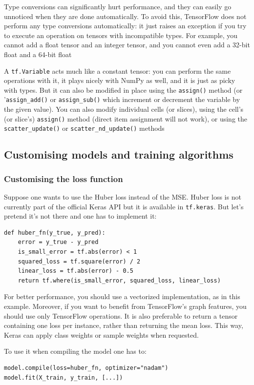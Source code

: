 \documentclass[12pt, letterpaper]{article}
\theoremstyle{definition}
\let\cd\lstinline
\begin{document}
Type conversions can significantly hurt performance, and they can easily go unnoticed when they are done automatically. To avoid this, TensorFlow does not perform any type conversions automatically: it just raises an exception if you try to execute an operation on tensors with incompatible types. For example, you cannot add a float tensor and an integer tensor, and you cannot even add a 32-bit float and a 64-bit float

A \cd+tf.Variable+ acts much like a constant tensor: you can perform the same operations with it, it plays nicely with NumPy as well, and it is just as picky with types. But it can also be modified in place using the \cd+assign()+ method (or '\cd+assign_add()+ or \cd+assign_sub()+ which increment or decrement the variable by the given value). You can also modify individual cells (or slices), using the cell's (or slice's) \cd+assign()+ method (direct item assignment will not work), or using the \cd+scatter_update()+ or \cd+scatter_nd_update()+ methods

\subsection{Customising  models and training algorithms}
\subsubsection{Customising the loss function}
Suppose one wants to use the Huber loss instead of the MSE. Huber loss is not currently part of the official Keras API but it is available in \cd+tf.keras+. But let's pretend it's not there and one has to implement it:
\begin{lstlisting}
def huber_fn(y_true, y_pred):
	error = y_true - y_pred
	is_small_error = tf.abs(error) < 1
	squared_loss = tf.square(error) / 2
	linear_loss = tf.abs(error) - 0.5
	return tf.where(is_small_error, squared_loss, linear_loss)
\end{lstlisting}
For better performance, you should use a vectorized implementation, as in this example. Moreover, if you want to benefit from TensorFlow's graph features, you should use only TensorFlow operations. 
It is also preferable to return a tensor containing one loss per instance, rather than returning the mean loss. This way, Keras can apply class weights or sample weights when requested.

To use it when compiling the model one has to:
\begin{lstlisting}
model.compile(loss=huber_fn, optimizer="nadam")
model.fit(X_train, y_train, [...])
\end{lstlisting}
\end{document}

